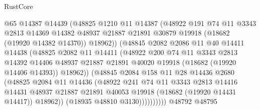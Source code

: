 \begin{lexlean}{RustCore}
\begin{coremodule}
                      @65
                      @14387
                      @14439
                      (@48825
                        @1210
                        @11
                        @14387
                        (@48922
                          @191
                          @74
                          @11
                          @3343
                          @2813
                          @14369
                          @14382
                          @48937
                          @21887
                          @21891
                          @30879
                          @19918
                          (@18682 (@19920 @14382 @14370))
                          @18962))
                      (@48845
                        @2082
                        @2086
                        @11
                        @40
                        @14411
                        @14438
                        (@48825
                          @2082
                          @11
                          @14411
                          (@48922
                            @200
                            @74
                            @11
                            @3343
                            @2813
                            @14392
                            @14406
                            @48937
                            @21887
                            @21891
                            @40020
                            @19918
                            (@18682 (@19920 @14406 @14393))
                            @18962))
                        (@48845
                          @2084
                          @158
                          @11
                          @28
                          @14436
                          @2680
                          (@48825
                            @2084
                            @11
                            @14436
                            (@48922
                              @241
                              @74
                              @11
                              @3343
                              @2813
                              @14416
                              @14431
                              @48937
                              @21887
                              @21891
                              @40053
                              @19918
                              (@18682 (@19920 @14431 @14417))
                              @18962))
                          (@18935 @48810 @3130))))))))))
        @48792
        @48795

\end{coremodule}
\end{lexlean}
